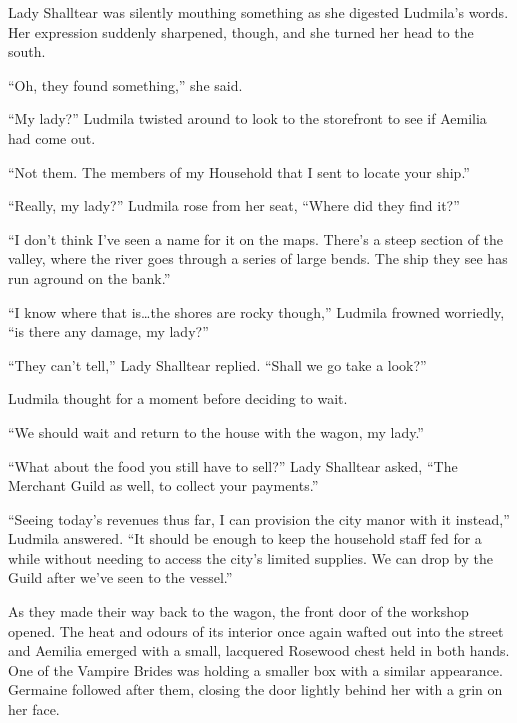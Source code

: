  

Lady Shalltear was silently mouthing something as she digested Ludmila’s words. Her expression suddenly sharpened, though, and she turned her head to the south.

 

“Oh, they found something,” she said.

 

“My lady?” Ludmila twisted around to look to the storefront to see if Aemilia had come out.

 

“Not them. The members of my Household that I sent to locate your ship.”

 

“Really, my lady?” Ludmila rose from her seat, “Where did they find it?”

 

“I don’t think I’ve seen a name for it on the maps. There’s a steep section of the valley, where the river goes through a series of large bends. The ship they see has run aground on the bank.”

 

“I know where that is…the shores are rocky though,” Ludmila frowned worriedly, “is there any damage, my lady?”

 

“They can’t tell,” Lady Shalltear replied. “Shall we go take a look?”

 

Ludmila thought for a moment before deciding to wait.

 

“We should wait and return to the house with the wagon, my lady.”

 

“What about the food you still have to sell?” Lady Shalltear asked, “The Merchant Guild as well, to collect your payments.”

 

“Seeing today’s revenues thus far, I can provision the city manor with it instead,” Ludmila answered. “It should be enough to keep the household staff fed for a while without needing to access the city’s limited supplies. We can drop by the Guild after we’ve seen to the vessel.”

 

As they made their way back to the wagon, the front door of the workshop opened. The heat and odours of its interior once again wafted out into the street and Aemilia emerged with a small, lacquered Rosewood chest held in both hands. One of the Vampire Brides was holding a smaller box with a similar appearance. Germaine followed after them, closing the door lightly behind her with a grin on her face.

